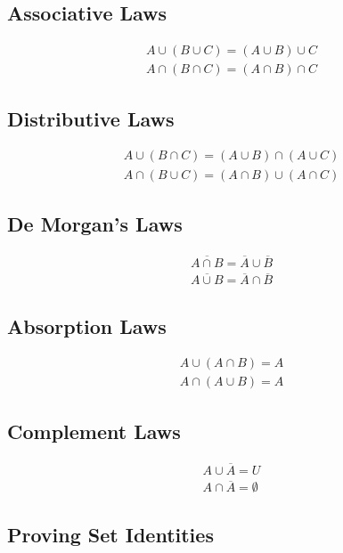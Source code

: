 \documentclass[12pt letter]{report}
\begin{document}
\subsection{Associative Laws}

\begin{align*}
  A \cup \left( B \cup  C \right)  = \left( A \cup B \right)  \cup C \\
  A \cap \left( B \cap C  \right)  = \left( A \cap B \right)  \cap C
\end{align*}

\subsection{Distributive Laws}

\begin{align*}
  A \cup \left( B \cap C \right)  = \left( A \cup B \right)  \cap \left( A \cup C \right) \\
  A \cap \left( B \cup C  \right)  = \left( A \cap B \right)  \cup \left( A \cap C \right)
\end{align*}

\subsection{De Morgan's Laws}
\begin{align*}
  \overline{A \cap  B} = \overline{A} \cup \overline{B} \\
  \overline{A \cup B } = \overline{A} \cap \overline{B}
\end{align*}

\subsection{Absorption Laws}
\begin{align*}
  A \cup \left( A \cap B \right) = A \\
  A \cap  \left( A \cup B  \right)  = A
\end{align*}

\subsection{Complement Laws}
\begin{align*}
  A \cup \overline{A} = U \\
  A \cap \overline{A} = \emptyset
\end{align*}

\subsection{Proving Set Identities}
\end{document}
